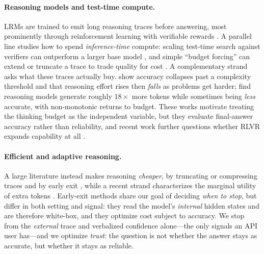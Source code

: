 \documentclass[11pt]{article}
\begin{document}
\paragraph{Reasoning models and test-time compute.}
LRMs are trained to emit long reasoning traces before answering, most
prominently through reinforcement learning with verifiable rewards
\citep{Shao2024GRPO, Guo2025DeepSeekR1}.
A parallel line studies how to spend \emph{inference-time} compute: scaling
test-time search against verifiers can outperform a larger base model
\citep{Snell2024TestTimeCompute}, and simple ``budget forcing'' can extend or
truncate a trace to trade quality for cost \citep{Muennighoff2025s1}.
A complementary strand asks what these traces actually buy.
\citet{Shojaee2025IllusionThinking} show accuracy collapses past a complexity
threshold and that reasoning effort rises then \emph{falls} as problems get
harder; \citet{Srivastava2025Overthink} find reasoning models generate roughly
$18\times$ more tokens while sometimes being \emph{less} accurate, with
non-monotonic returns to budget.
These works motivate treating the thinking budget as the independent variable,
but they evaluate final-answer accuracy rather than reliability, and recent
work further questions whether RLVR expands capability at all
\citep{Yue2025RLBeyondBase, Zhao2025SpuriousRewards}.

\paragraph{Efficient and adaptive reasoning.}
A large literature instead makes reasoning \emph{cheaper}, by truncating or
compressing traces and by early exit \citep{Chen2024Overthinking,
Sui2025StopOverthinking, StepGRPO2026, EarlyExit2026}, while a recent strand
characterizes the marginal utility of extra tokens
\citep{WhenMoreThinkingHurts2026}.
Early-exit methods share our goal of deciding \emph{when to stop}, but differ
in both setting and signal: they read the model's \emph{internal} hidden states
and are therefore white-box, and they optimize cost subject to accuracy.
We stop from the \emph{external} trace and verbalized confidence alone---the
only signals an API user has---and we optimize \emph{trust}: the question is
not whether the answer stays as accurate, but whether it stays as reliable.
\end{document}
